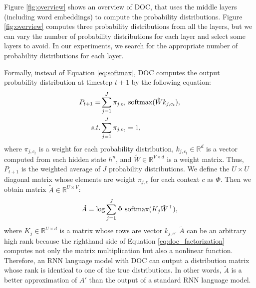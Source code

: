 \documentclass[11pt,a4paper]{article}
\begin{document}
Figure \ref{fig:overview} shows an overview of DOC, that uses the middle layers (including word embeddings) to compute the probability distributions.
Figure \ref{fig:overview} computes three probability distributions from all the layers, but we can vary the number of probability distributions for each layer and select some layers to avoid.
In our experiments, we search for the appropriate number of probability distributions for each layer.


Formally, instead of Equation \ref{eq:softmax}, DOC computes the output probability distribution at timestep $t+1$ by the following equation:
\begin{align}
  P_{t+1} = &\sum_{j=1}^{J} \pi_{j, c_t} \  {\rm softmax} (\tilde{W} k_{j, c_t}), \label{eq:doc} \\
  s.t. &\sum_{j=1}^{J} \pi_{j, c_t} = 1,
\end{align}
where $\pi_{j, c_t}$ is a weight for each probability distribution, $k_{j, c_t} \in \mathbb{R}^{d}$ is a vector computed from each hidden state $h^{n}$, and $\tilde{W} \in \mathbb{R}^{V \times d}$ is a weight matrix.
Thus, $P_{t+1}$ is the weighted average of $J$ probability distributions.
We define the $U \times U$ diagonal matrix whose elements are weight $\pi_{j, c}$ for each context $c$ as $\Phi$.
Then we obtain matrix $\tilde{A} \in \mathbb{R}^{U \times V}$:
\begin{align}
  \tilde{A} = {\rm log} \sum_{j=1}^{J} \Phi \  {\rm softmax}(K_{j} \tilde{W}^\top), \label{eq:doc_factorization}
\end{align}
where $K_{j} \in \mathbb{R}^{U \times d}$ is a matrix whose rows are vector $k_{j, c}$.
$\tilde{A}$ can be an arbitrary high rank because the righthand side of Equation \ref{eq:doc_factorization} computes not only the matrix multiplication but also a nonlinear function.
Therefore, an RNN language model with DOC can output a distribution matrix whose rank is identical to one of the true distributions.
In other words, $\tilde{A}$ is a better approximation of $A'$ than the output of a standard RNN language model.
\end{document}

